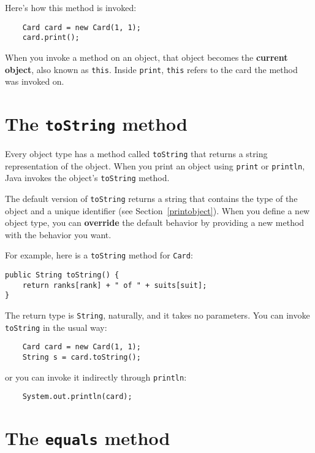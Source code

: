 \documentclass[12pt]{book}
\theoremstyle{definition}
\begin{document}
Here's how this method is invoked:

\begin{lstlisting}
    Card card = new Card(1, 1);
    card.print();
\end{lstlisting}

When you invoke a method on an object, that object becomes the {\bf
current object}, also known as {\tt this}.  Inside {\tt print},
{\tt this} refers to the card the method was invoked on.


\section{The {\tt toString} method}

Every object type has a method called {\tt toString} that returns a
string representation of the object.  When you print an object using
{\tt print} or {\tt println}, Java invokes the object's {\tt toString}
method.

The default
version of {\tt toString} returns a string that contains the type
of the object and a unique identifier (see Section~\ref{printobject}).
When you define a new object
type, you can {\bf override} the default behavior by providing a
new method with the behavior you want.

For example, here is a {\tt toString} method for {\tt Card}:

\begin{lstlisting}
public String toString() {
    return ranks[rank] + " of " + suits[suit];
}
\end{lstlisting}
%
The return type is {\tt String}, naturally,
and it takes no parameters.  You can invoke {\tt toString} in
the usual way:

\begin{lstlisting}
    Card card = new Card(1, 1);
    String s = card.toString();
\end{lstlisting}
%
or you can invoke it indirectly through {\tt println}:

\begin{lstlisting}
    System.out.println(card);
\end{lstlisting}


\section{The {\tt equals} method}
\end{document}
